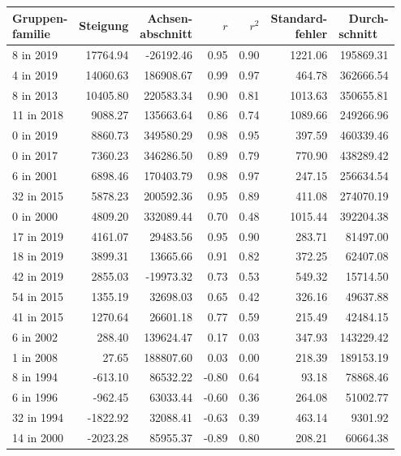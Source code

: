 \begin{tabular}{lrrrrrr}
\toprule
\makecell{Gruppen- \\ familie} &  Steigung &  \makecell{Achsen- \\ abschnitt} &   $r$ &  $r^2$ &  \makecell{Standard- \\ fehler} &  \makecell{Durch- \\ schnitt}  \ \\
\midrule
     8 in 2019 &  17764.94 &        -26192.46 &  0.95 &   0.90 &         1221.06 &     195869.31 \\
     4 in 2019 &  14060.63 &        186908.67 &  0.99 &   0.97 &          464.78 &     362666.54 \\
     8 in 2013 &  10405.80 &        220583.34 &  0.90 &   0.81 &         1013.63 &     350655.81 \\
    11 in 2018 &   9088.27 &        135663.64 &  0.86 &   0.74 &         1089.66 &     249266.96 \\
     0 in 2019 &   8860.73 &        349580.29 &  0.98 &   0.95 &          397.59 &     460339.46 \\
     0 in 2017 &   7360.23 &        346286.50 &  0.89 &   0.79 &          770.90 &     438289.42 \\
     6 in 2001 &   6898.46 &        170403.79 &  0.98 &   0.97 &          247.15 &     256634.54 \\
    32 in 2015 &   5878.23 &        200592.36 &  0.95 &   0.89 &          411.08 &     274070.19 \\
     0 in 2000 &   4809.20 &        332089.44 &  0.70 &   0.48 &         1015.44 &     392204.38 \\
    17 in 2019 &   4161.07 &         29483.56 &  0.95 &   0.90 &          283.71 &      81497.00 \\
    18 in 2019 &   3899.31 &         13665.66 &  0.91 &   0.82 &          372.25 &      62407.08 \\
    42 in 2019 &   2855.03 &        -19973.32 &  0.73 &   0.53 &          549.32 &      15714.50 \\
    54 in 2015 &   1355.19 &         32698.03 &  0.65 &   0.42 &          326.16 &      49637.88 \\
    41 in 2015 &   1270.64 &         26601.18 &  0.77 &   0.59 &          215.49 &      42484.15 \\
     6 in 2002 &    288.40 &        139624.47 &  0.17 &   0.03 &          347.93 &     143229.42 \\
     1 in 2008 &     27.65 &        188807.60 &  0.03 &   0.00 &          218.39 &     189153.19 \\
     8 in 1994 &   -613.10 &         86532.22 & -0.80 &   0.64 &           93.18 &      78868.46 \\
     6 in 1996 &   -962.45 &         63033.44 & -0.60 &   0.36 &          264.08 &      51002.77 \\
    32 in 1994 &  -1822.92 &         32088.41 & -0.63 &   0.39 &          463.14 &       9301.92 \\
    14 in 2000 &  -2023.28 &         85955.37 & -0.89 &   0.80 &          208.21 &      60664.38 \\
\bottomrule
\end{tabular}
